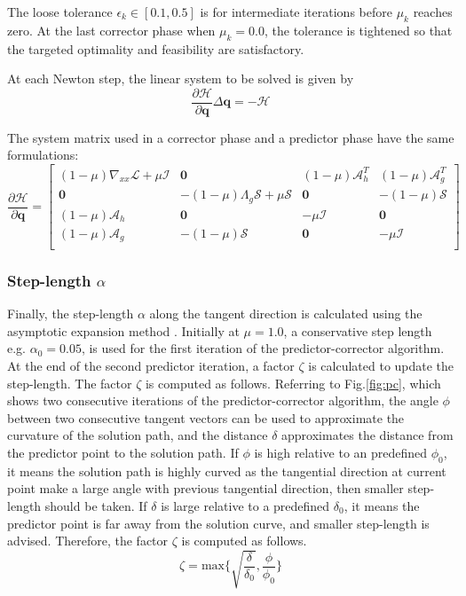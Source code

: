 \documentclass{article}
\theoremstyle{definition}
\begin{document}
The loose tolerance $\epsilon_k \in [0.1, 0.5]$ is for intermediate iterations before $\mu_k$ reaches zero. At the last corrector phase when $\mu_k = 0.0$, the tolerance is tightened so that the targeted optimality and feasibility are satisfactory.  

At each Newton step, the linear system to be solved is given by
\begin{equation}\label{eq:cor}
\frac{\partial \mathcal{H}}{\partial \boldsymbol{q}} \Delta \boldsymbol{q} = -\mathcal{H} 
\end{equation}

The system matrix used in a corrector phase and a predictor phase have the same formulations:
\begin{equation}\label{eq:dHdq}
\frac{\partial \mathcal{H}}{\partial \boldsymbol{q}} = \begin{bmatrix}
(1-\mu) \nabla_{xx} \mathcal{L}  + \mu \mathcal{I} & \boldsymbol{0} & (1-\mu)\mathcal{A}^T_h   & (1-\mu)\mathcal{A}^T_g   \\
\boldsymbol{0}     &  -(1-\mu) \Lambda_g \mathcal{S} + \mu  \mathcal{S}   & \boldsymbol{0} & -(1-\mu)\mathcal{S}     \\
(1-\mu)\mathcal{A}_h  &  \boldsymbol{0}   & -\mu \mathcal{I} &  \boldsymbol{0}  \\
(1-\mu)\mathcal{A}_g  & -(1-\mu) \mathcal{S}  &  \boldsymbol{0}  & -\mu \mathcal{I}   \\
\end{bmatrix}
\end{equation}

\subsubsection{Step-length $\alpha$}
Finally, the step-length $\alpha$ along the tangent direction is calculated using the asymptotic expansion method \cite{Brown_2016, allgower3}. Initially at $\mu = 1.0$, a conservative step length e.g. $\alpha_0 = 0.05$, is used for the first iteration of the predictor-corrector algorithm. At the end of the second predictor iteration, a factor $\zeta$ is calculated to update the step-length. The factor $\zeta$ is computed as follows.  Referring to Fig.\ref{fig:pc}, which shows two consecutive iterations of the predictor-corrector algorithm, the angle $\phi$ between two consecutive tangent vectors can be used to approximate the curvature of the solution path, and the distance $\delta$ approximates the distance from the predictor point to the solution path. 
If $\phi$ is high relative to an predefined $\phi_0$, it means the solution path is highly curved as the tangential direction at current point make a large angle with previous tangential direction, then smaller step-length should be taken. If $\delta$ is large relative to a predefined $\delta_0$, it means the predictor point is far away from the solution curve, and smaller step-length is advised. Therefore, the factor $\zeta$ is computed as follows. 
\begin{equation}\label{eq:faclen}
\zeta = \textrm{max} \{ \sqrt{\frac{\delta}{\delta_0} }, \frac{\phi}{\phi_0}  \}  
\end{equation}
\end{document}
